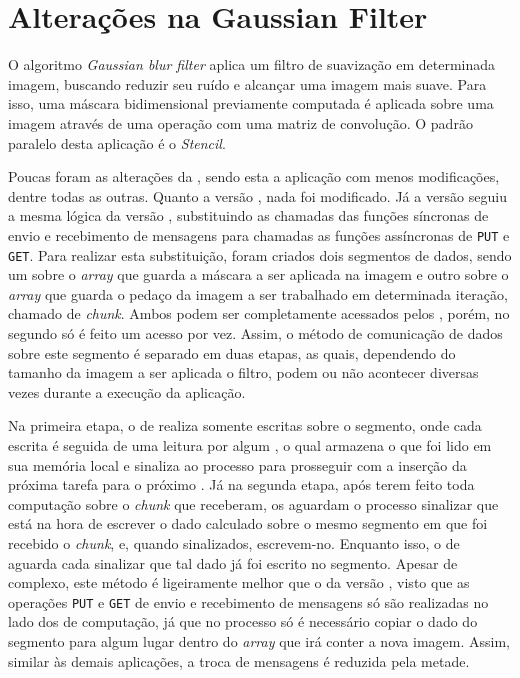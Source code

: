 \section{Alterações na Gaussian Filter}
\label{sec:alteracoesgf}

O algoritmo \textit{Gaussian blur filter} aplica um filtro de suavização em determinada imagem, buscando reduzir seu ruído e alcançar uma imagem mais suave. Para isso, uma máscara bidimensional previamente computada é aplicada sobre uma imagem através de uma operação com uma matriz de convolução. O padrão paralelo desta aplicação é o \textit{Stencil}.

Poucas foram as alterações da \textit{\GF}, sendo esta a aplicação com menos modificações, dentre todas as outras. Quanto a versão \IPC, nada foi modificado. Já a versão \ASYNC seguiu a mesma lógica da versão \IPC, substituindo as chamadas das funções síncronas de envio e recebimento de mensagens para chamadas as funções assíncronas de \texttt{PUT} e \texttt{GET}. Para realizar esta substituição, foram criados dois segmentos de dados, sendo um sobre o \textit{array} que guarda a máscara a ser aplicada na imagem e outro sobre o \textit{array} que guarda o pedaço da imagem a ser trabalhado em determinada iteração, chamado de \textit{chunk}. Ambos podem ser completamente acessados pelos \slaves, porém, no segundo só é feito um acesso por vez. Assim, o método de comunicação de dados sobre este segmento é separado em duas etapas, as quais, dependendo do tamanho da imagem a ser aplicada o filtro, podem ou não acontecer diversas vezes durante a execução da aplicação. 

Na primeira etapa, o \cluster de \IO realiza somente escritas sobre o segmento, onde cada escrita é seguida de uma leitura por algum \CC, o qual armazena o que foi lido em sua memória local e sinaliza ao processo \master para prosseguir com a inserção da próxima tarefa para o próximo \CC. Já na segunda etapa, após terem feito toda computação sobre o \textit{chunk} que receberam, os \CCs aguardam o processo \master sinalizar que está na hora de escrever o dado calculado sobre o mesmo segmento em que foi recebido o \textit{chunk}, e, quando sinalizados, escrevem-no. Enquanto isso, o \cluster de \IO aguarda cada \CC sinalizar que tal dado já foi escrito no segmento. Apesar de complexo, este método é ligeiramente melhor que o da versão \IPC, visto que as operações \texttt{PUT} e \texttt{GET} de envio e recebimento de mensagens só são realizadas no lado dos \clusters de computação, já que no processo \master só é necessário copiar o dado do segmento para algum lugar dentro do \textit{array} que irá conter a nova imagem. Assim, similar às demais aplicações, a troca de mensagens é reduzida pela metade.

